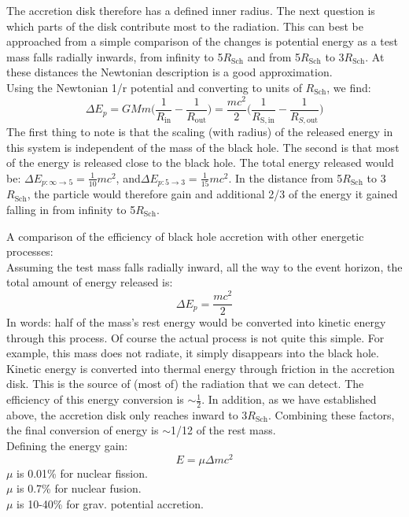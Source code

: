 \documentclass[11pt]{article}
\begin{document}
\noindent
The accretion disk therefore has a defined inner radius. The next question is which parts of the disk contribute most to the radiation. This can best be approached from a simple comparison of the changes is potential energy as a test mass falls radially inwards, from infinity to 5$R_\mathrm{Sch}$ and from 5$R_\mathrm{Sch}$ to 3$R_\mathrm{Sch}$. At these distances the Newtonian description is a good approximation.\\
\indent Using the Newtonian 1/r potential and converting to units of $R_{\mathrm{Sch}}$, we find:
\begin{equation}
  \Delta E_{p} = G M m\Bigg(\frac{1}{R_{\mathrm{in}}} - \frac{1}{R_{\mathrm{out}}}\Bigg) = \frac{mc^2}{2}\Bigg(\frac{1}{R_{\mathrm{S,in}}} - \frac{1}{R_{S,\mathrm{out}}}\Bigg)
\end{equation}
The first thing to note is that the scaling (with radius) of the released energy in this system is independent of the mass of the black hole. The second is that most of the energy is released close to the black hole. The total energy released would be: $\Delta E_{p:\infty\rightarrow 5} = \frac{1}{10}mc^2$, and$\Delta E_{p:5\rightarrow 3} = \frac{1}{15}mc^2$. In the distance from 5$R_{\mathrm{Sch}}$ to 3$R_{\mathrm{Sch}}$, the particle would therefore gain and additional 2/3 of the energy it gained falling in from infinity to 5$R_{\mathrm{Sch}}$.\\
\begin{framed}
\noindent
A comparison of the efficiency of black hole accretion with other energetic processes:\\

\noindent
Assuming the test mass falls radially inward, all the way to the event horizon, the total amount of energy released is:
$$
\Delta E_p = \frac{mc^2}{2}
$$
\noindent
In words: half of the mass's rest energy would be converted into kinetic energy through this process. Of course the actual process is not quite this simple. For example, this mass does not radiate, it simply disappears into the black hole. Kinetic energy is converted into thermal energy through friction in the accretion disk. This is the source of (most of) the radiation that we can detect. The efficiency of this energy conversion is $\sim\frac{1}{2}$. In addition, as we have established above, the accretion disk only reaches inward to 3$R_{\mathrm{Sch}}$. Combining these factors, the final conversion of energy is $\sim$1/12 of the rest mass.\\
Defining the energy gain:
\begin{equation}
 E = \mu \Delta m c^{2} 
\end{equation}
$\mu$ is 0.01\% for nuclear fission.\\
$\mu$ is 0.7\% for nuclear fusion. \\
$\mu$ is 10-40\% for grav. potential accretion.\\
\end{framed}
\end{document}
